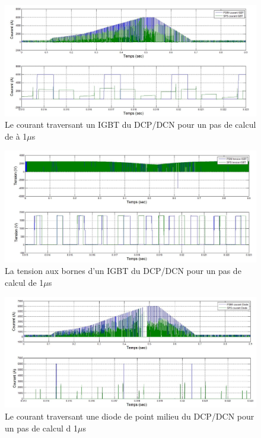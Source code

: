 \begin{figure}[htb]
\centering
\includegraphics[scale=0.5]{fig/DCP_AFE/1u/hash_cou_IGBT.jpg}
\caption{Le courant traversant un IGBT du DCP/DCN pour un pas de calcul de à 1$\mu$s}
\label{AF_DC_HAA1}
\end{figure}



\begin{figure}[htb]
\centering
\includegraphics[scale=0.5]{fig/DCP_AFE/1u/hash_ten_IGBT.jpg}
\caption{La tension aux bornes d'un IGBT du DCP/DCN pour un pas de calcul de 1$\mu$s}
\label{AF_DC_HAV1}
\end{figure}



\begin{figure}[htb]
\centering
\includegraphics[scale=0.5]{fig/DCP_AFE/1u/hash_diode_cou.jpg}
\caption{Le courant traversant une diode de point milieu du DCP/DCN pour un pas de calcul d 1$\mu$s}
\label{AF_DC_HA1}
\end{figure}


